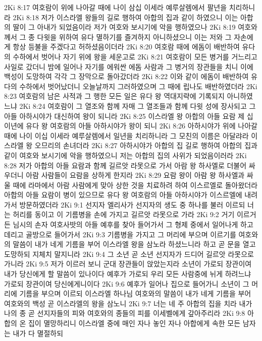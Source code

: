 2Ki 8:17  여호람이 위에 나아갈 때에 나이 삼십 이세라 예루살렘에서 팔년을 치리하니라
2Ki 8:18  저가 이스라엘 왕들의 길로 행하여 아합의 집과 같이 하였으니 이는 아합의 딸이 그 아내가 되었음이라 저가 여호와 보시기에 악을 행하였으나
2Ki 8:19  여호와께서 그 종 다윗을 위하여 유다 멸하기를 즐겨하지 아니하셨으니 이는 저와 그 자손에게 항상 등불을 주겠다고 허하셨음이더라
2Ki 8:20  여호람 때에 에돔이 배반하여 유다의 수하에서 벗어나 자기 위에 왕을 세운고로
2Ki 8:21  여호람이 모든 병거를 거느리고 사일로 갔더니 밤에 일어나 자기를 에워싼 에돔 사람과 그 병거의 장관들을 치니 이에 백성이 도망하여 각각 그 장막으로 돌아갔더라
2Ki 8:22  이와 같이 에돔이 배반하여 유다의 수하에서 벗어났더니 오늘날까지 그러하였으며 그 때에 립나도 배반하였더라
2Ki 8:23  여호람의 남은 사적과 그 행한 모든 일은 유다 왕 역대지략에 기록되지 아니하였느냐
2Ki 8:24  여호람이 그 열조와 함께 자매 그 열조들과 함께 다윗 성에 장사되고 그 아들 아하시야가 대신하여 왕이 되니라
2Ki 8:25  이스라엘 왕 아합의 아들 요람 제 십 이년에 유다 왕 여호람의 아들 아하시야가 왕이 되니
2Ki 8:26  아하시야가 위에 나아갈 때에 나이 이십 이세라 예루살렘에서 일년을 치리하니라 그 모친의 이름은 아달랴라 이스라엘 왕 오므리의 손녀더라
2Ki 8:27  아하시야가 아합의 집 길로 행하여 아합의 집과 같이 여호와 보시기에 악을 행하였으니 저는 아합의 집의 사위가 되었음이러라
2Ki 8:28  저가 아합의 아들 요람과 함께 길르앗 라못으로 가서 아람 왕 하사엘로 더불어 싸우더니 아람 사람들이 요람을 상하게 한지라
2Ki 8:29  요람 왕이 아람 왕 하사엘과 싸울 때에 라마에서 아람 사람에게 맞아 상한 것을 치료하려 하여 이스르엘로 돌아왔더라 아합의 아들 요람이 병이 있으므로 유다 왕 여호람의 아들 아하시야가 이스르엘에 내려가서 방문하였더라
2Ki 9:1  선지자 엘리사가 선지자의 생도 중 하나를 불러 이르되 너는 허리를 동이고 이 기름병을 손에 가지고 길르앗 라못으로 가라
2Ki 9:2  거기 이르거든 님시의 손자 여호사밧의 아들 예후를 찾아 들어가서 그 형제 중에서 일어나게 하고 데리고 골방으로 들어가서
2Ki 9:3  기름병을 가지고 그 머리에 부으며 이르기를 여호와의 말씀이 내가 네게 기름을 부어 이스라엘 왕을 삼노라 하셨느니라 하고 곧 문을 열고 도망하되 지체치 말지니라
2Ki 9:4  그 소년 곧 소년 선지자가 드디어 길르앗 라못으로 가니라
2Ki 9:5  저가 이르러 보니 군대 장관들이 앉았는지라 소년이 가로되 장관이여 내가 당신에게 할 말씀이 있나이다 예후가 가로되 우리 모든 사람중에 뉘게 하려느냐 가로되 장관이여 당신에게니이다
2Ki 9:6  예후가 일어나 집으로 들어가니 소년이 그 머리에 기름을 부으며 이르되 이스라엘 하나님 여호와의 말씀이 내가 네게 기름을 부어 여호와의 백성 곧 이스라엘의 왕을 삼노니
2Ki 9:7  너는 네 주 아합의 집을 치라 내가 나의 종 곧 선지자들의 피와 여호와의 종들의 피를 이세벨에게 갚아주리라
2Ki 9:8  아합의 온 집이 멸망하리니 이스라엘 중에 매인 자나 놓인 자나 아합에게 속한 모든 남자는 내가 다 멸절하되
